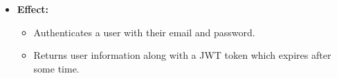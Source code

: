 \documentclass[12pt, a4paper]{article}
\begin{document}
\begin{enumerate}
\begin{itemize}
        \begin{verbatim}
{
    "message": "Login successful",
    "user": {
        "userId": "123e4567-e89b-12d3-a456-426614174000",
        "email": "user@example.com",
        "firstName": "John",
        "lastName": "Doe",
        "token": "eyJhbGciOiJIUzI1NiIsInR..."
    }
}
        \end{verbatim}
        \item \textbf{Effect:}
        \begin{itemize}
            \item Authenticates a user with their email and password.
            \item Returns user information along with a JWT token which expires after some time.
        \end{itemize}
    \end{itemize}
    \end{enumerate}
    
\end{document}
